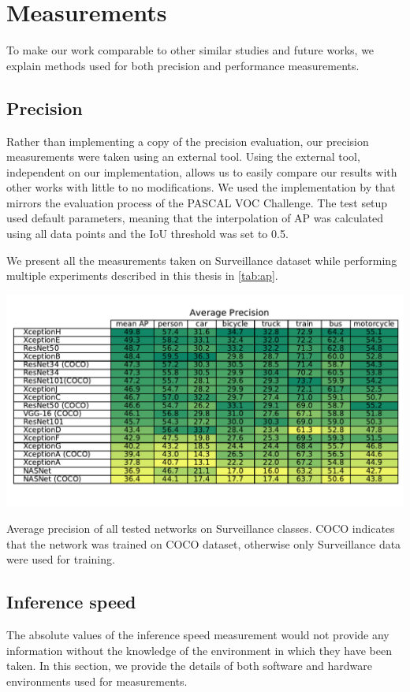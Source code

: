 \section{Measurements}
To make our work comparable to other similar studies and future works, we explain methods used for both precision and performance measurements.

\subsection{Precision}
Rather than implementing a copy of the precision evaluation, our precision measurements were taken using an external tool. Using the external tool, independent on our implementation, allows us to easily compare our results with other works with little to no modifications. We used the implementation by \citet{bib:metricsgit} that mirrors the evaluation process of the PASCAL VOC Challenge. The test setup used default parameters, meaning that the interpolation of AP was calculated using all data points and the IoU threshold was set to 0.5. 

We present all the measurements taken on Surveillance dataset while performing multiple experiments described in this thesis in \cref{tab:ap}.


\begin{table}
    \centering
    \includegraphics[width=\textwidth]{img/ap}
    \caption[Average precision of all tested networks on Surveillance classes]{Average precision of all tested networks on Surveillance classes. COCO indicates that the network was trained on COCO dataset, otherwise only Surveillance data were used for training.} 
    \label{tab:ap}
\end{table}

\subsection{Inference speed}
The absolute values of the inference speed measurement would not provide any information without the knowledge of the environment in which they have been taken. In this section, we provide the details of both software and hardware environments used for measurements.

